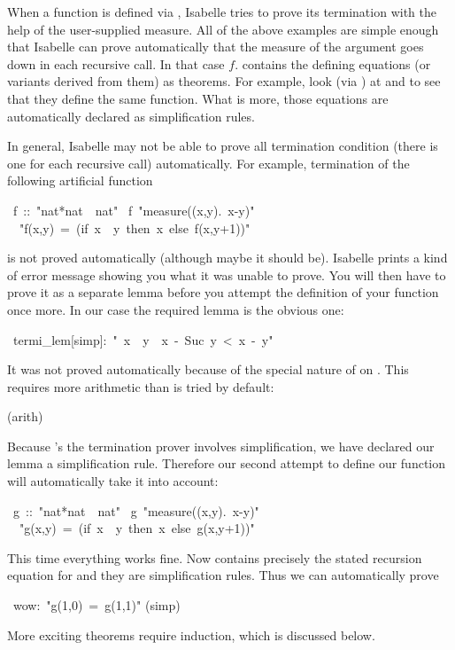 \begin{isabelle}%
%
\begin{isamarkuptext}%
When a function is defined via , Isabelle tries to prove
its termination with the help of the user-supplied measure.  All of the above
examples are simple enough that Isabelle can prove automatically that the
measure of the argument goes down in each recursive call. In that case
$f$. contains the defining equations (or variants derived from
them) as theorems. For example, look (via ) at
 and  to see that they define the same
function. What is more, those equations are automatically declared as
simplification rules.

In general, Isabelle may not be able to prove all termination condition
(there is one for each recursive call) automatically. For example,
termination of the following artificial function%
\end{isamarkuptext}%
~f~::~{"}nat*nat~{\isasymRightarrow}~nat{"}\isanewline
{}~f~{"}measure({\isasymlambda}(x,y).~x-y){"}\isanewline
~~{"}f(x,y)~=~(if~x~{\isasymle}~y~then~x~else~f(x,y+1)){"}%
\begin{isamarkuptext}%
\noindent
is not proved automatically (although maybe it should be). Isabelle prints a
kind of error message showing you what it was unable to prove. You will then
have to prove it as a separate lemma before you attempt the definition
of your function once more. In our case the required lemma is the obvious one:%
\end{isamarkuptext}%
~termi\_lem[simp]:~{"}{\isasymnot}~x~{\isasymle}~y~{\isasymLongrightarrow}~x~-~Suc~y~<~x~-~y{"}%
\begin{isamarkuptxt}%
\noindent
It was not proved automatically because of the special nature of \isa{-}
on . This requires more arithmetic than is tried by default:%
\end{isamarkuptxt}%
(arith)%
\begin{isamarkuptext}%
\noindent
Because 's the termination prover involves simplification,
we have declared our lemma a simplification rule. Therefore our second
attempt to define our function will automatically take it into account:%
\end{isamarkuptext}%
~g~::~{"}nat*nat~{\isasymRightarrow}~nat{"}\isanewline
{}~g~{"}measure({\isasymlambda}(x,y).~x-y){"}\isanewline
~~{"}g(x,y)~=~(if~x~{\isasymle}~y~then~x~else~g(x,y+1)){"}%
\begin{isamarkuptext}%
\noindent
This time everything works fine. Now  contains precisely the
stated recursion equation for  and they are simplification
rules. Thus we can automatically prove%
\end{isamarkuptext}%
~wow:~{"}g(1,0)~=~g(1,1){"}\isanewline
{}(simp)%
\begin{isamarkuptext}%
\noindent
More exciting theorems require induction, which is discussed below.


\end{isamarkuptext}
\end{isabelle}
